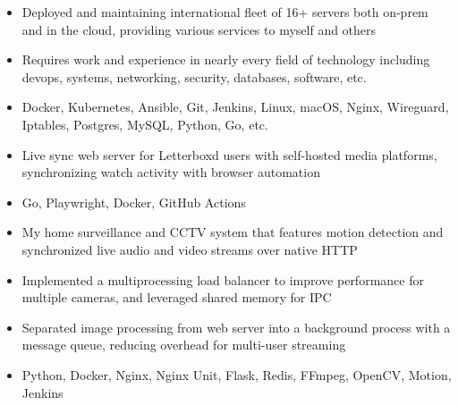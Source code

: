 \documentclass[11pt,letterpaper]{article}
\begin{document}
  \ifhomelab
    {\fontsize{12}{12}}

    \begin{itemize}
      \item{Deployed and maintaining international fleet of 16+ servers both on-prem and in the cloud, providing various services to myself and others}
      \item{Requires work and experience in nearly every field of technology including devops, systems, networking, security, databases, software, etc.}
      \item{
        {}
        Docker, Kubernetes, Ansible, Git, Jenkins, Linux, macOS, Nginx, Wireguard, Iptables, Postgres, MySQL, Python, Go, etc.
      }
    \end{itemize}
  \fi

  \ifemboxd
    {\fontsize{12}{12}}

    \begin{itemize}
      \item{Live sync web server for Letterboxd users with self-hosted media platforms, synchronizing watch activity with browser automation}
      \item{
        {}
        Go, Playwright, Docker, GitHub Actions
      }
    \end{itemize}
  \fi

  \ifguardian
    {\fontsize{12}{12}}

    \begin{itemize}
      \item{My home surveillance and CCTV system that features motion detection and synchronized live audio and video streams over native HTTP}
      \item{Implemented a multiprocessing load balancer to improve performance for multiple cameras, and leveraged shared memory for IPC}
      \item{Separated image processing from web server into a background process with a message queue, reducing overhead for multi-user streaming}
      \item{
        {}
        Python, Docker, Nginx, Nginx Unit, Flask, Redis, FFmpeg, OpenCV, Motion, Jenkins
      }
    \end{itemize}
  \fi
\end{document}
